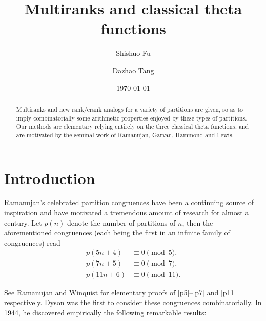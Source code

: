 \documentclass[12pt]{amsart}
\numberwithin{equation}{section}
\theoremstyle{plain}
\theoremstyle{definition}
\begin{document}
\title[Multiranks and classical theta functions]{Multiranks and classical theta functions}


\author[S. Fu]{Shishuo Fu}
\address[Shishuo Fu]{College of Mathematics and Statistics, Chongqing University, Huxi Campus LD506, Chongqing 401331, P.R. China}


\author[D. Tang]{Dazhao Tang}

\address[Dazhao Tang]{College of Mathematics and Statistics, Chongqing University, Huxi Campus LD208, Chongqing 401331, P.R. China}

\date{\today}


\begin{abstract}
Multiranks and new rank/crank analogs for a variety of partitions are given, so as to imply combinatorially some arithmetic properties enjoyed by these types of partitions. Our methods are elementary relying entirely on the three classical theta functions, and are motivated by the seminal work of Ramanujan, Garvan, Hammond and Lewis.
\end{abstract}




\maketitle




\section{Introduction}\label{sec:intro}


Ramanujan's celebrated partition congruences have been a continuing source of inspiration and have motivated a tremendous amount of research for almost a century. Let $p(n)$ denote the number of partitions of $n$, then the aforementioned congruences (each being the first in an infinite family of congruences) read
\begin{align}
\label{p5}p(5n+4)&\equiv 0 \pmod 5,\\
\label{p7}p(7n+5)&\equiv 0 \pmod 7,\\
\label{p11}p(11n+6)&\equiv 0 \pmod {11}.
\end{align}

See Ramanujan \cite{Ram} and Winquist \cite{Win} for elementary proofs of \eqref{p5}--\eqref{p7} and \eqref{p11} respectively. Dyson \cite{Dys} was the first to consider these congruences combinatorially. In 1944, he discovered empirically the following remarkable results:
\end{document}
